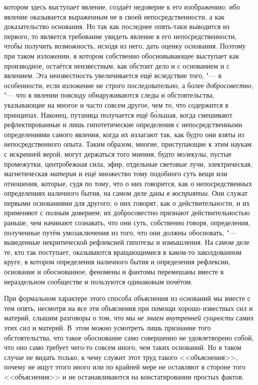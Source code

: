 котором здесь выступает явление, создаёт недоверие к его изображению; ибо
явление оказывается выраженным не в своей непосредственности, а как
доказательство основания. Но так как последнее опять-таки выводится из первого,
то является требование увидеть явление в его непосредственности, чтобы получить
возможность, исходя из него, дать оценку основания. Поэтому при таком
изложении, в котором собственно обосновывающее выступает как производное,
остаётся неизвестным, как обстоит дело и с основанием и с явлением. Эта
неизвестность увеличивается ещё вследствие того, "--- в особенности, если
изложение не строго последовательно, а более {\em добросовестно,} "--- что в
явлении повсюду обнаруживаются следы и обстоятельства, указывающие на многое и
часто совсем другое, чем то, что содержится в принципах. Наконец, путаница
получается ещё б\'{о}льшая, когда смешивают рефлектированные и лишь
гипотетические определения с непосредственными определениями самого явления,
когда их излагают так, как будто они взяты из непосредственного опыта. Таким
образом, многие, приступающие к этим наукам с искренней верой, могут держаться
того мнения, будто молекулы, пустые промежутки, центробежная сила, эфир,
отдельные световые лучи, электрическая, магнетическая {\em материя} и ещё
множество тому подобного суть вещи или отношения, которые, судя по тому, что о
них говорится, как о непосредственных определениях наличного бытия, на самом
деле даны {\em в восприятии}. Они служат первыми основаниями для другого; о них
говорят, как о действительности, и их применяют с полным доверием; их
добросовестно признают действительностью раньше, чем начинают сознавать, что
они суть, собственно говоря, определения, полученные путём умозаключения из
того, что они должны обосновать, "--- выведенные некритической рефлексией
гипотезы и измышления. На самом деле те, кто так поступает, оказываются
вращающимися в каком-то заколдованном круге, в котором определения наличного
бытия и определения рефлексии, основание и обоснованное, феномены и фантомы
перемешаны вместе в нераздельном сообществе и пользуются одинаковым почётом.

При формальном характере этого способа объяснения из оснований мы вместе с тем
опять, несмотря на все эти объяснения при помощи хорошо известных сил и
материй, слышим разговоры о том, что мы {\em не знаем внутренней сущности}
самих этих сил и материй. В~этом можно усмотреть лишь признание того
обстоятельства, что такое обоснование само совершенно не удовлетворено собой,
что оно само требует чего-то совсем иного, чем таких оснований. Но в таком
случае не видать только, к чему служит этот труд такого <<объяснения>>, почему
не ищут этого иного или по крайней мере не оставляют в стороне того
<<объяснения>> и не останавливаются на констатировании простых фактов.


